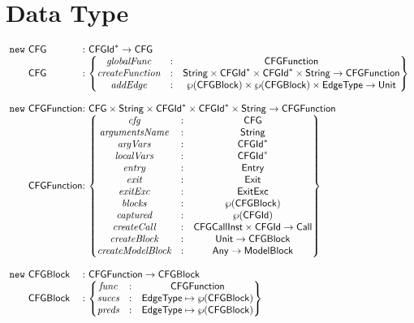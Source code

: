 \section{Data Type}
\[
\begin{array}{@{~}r@{~}l@{}l@{~}l}
\new & \CFG & : & \CFGId^{*} \rightarrow \CFG \\
& \CFG & : &
\begin{Bmatrix}
\emph{globalFunc} & : & \SF{CFGFunction} \\
\emph{createFunction} & : & \String \times \CFGId^{*} \times \CFGId^{*} \times \String \rightarrow \CFGFunction \\
\emph{addEdge} & : & \powerset{\CFGBlock} \times \powerset{\CFGBlock} \times \EdgeType \rightarrow \Unit \\
\end{Bmatrix}\\
&&&\\

\new & \CFGFunction & : & \CFG \times \String \times \CFGId^{*} \times \CFGId^{*} \times \String \rightarrow \CFGFunction \\
& \CFGFunction & : &
\begin{Bmatrix}
\emph{cfg} & : & \CFG \\
\emph{argumentsName} & : & \String \\
\emph{argVars} & : & \CFGId^{*} \\
\emph{localVars} & : & \CFGId^{*} \\
\emph{entry} & : & \Entry \\
\emph{exit} & : & \Exit \\
\emph{exitExc} & : & \ExitExc \\
\emph{blocks} & : & \powerset{\CFGBlock}\\
\emph{captured} & : & \powerset{\CFGId} \\
\emph{createCall} & : & \CFGCallInst \times \CFGId \rightarrow \Call \\
\emph{createBlock} & : & \Unit \rightarrow \CFGBlock \\
\emph{createModelBlock} & : & \Any \rightarrow \ModelBlock \\
\end{Bmatrix}\\
&&&\\

\new & \CFGBlock & : & \CFGFunction \rightarrow \CFGBlock \\
& \CFGBlock & : &
\begin{Bmatrix}
\emph{func} & : & \CFGFunction \\
\emph{succs} & : & \EdgeType \mapsto \powerset{\CFGBlock} \\
\emph{preds} & : & \EdgeType \mapsto \powerset{\CFGBlock} \\
\end{Bmatrix}\\
&&&\\


\end{array}\]
